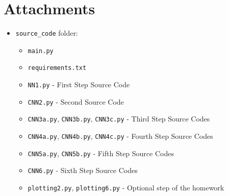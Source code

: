 \documentclass[a4paper, 11pt]{article}
\begin{document}
	\section*{Attachments}
	\begin{itemize}
		\item \texttt{source\_code} folder:
		\begin{itemize}
			\item \texttt{main.py}
			\item \texttt{requirements.txt}
			\item \texttt{NN1.py} - First Step Source Code
			\item \texttt{CNN2.py} - Second Source Code
			\item \texttt{CNN3a.py}, \texttt{CNN3b.py}, \texttt{CNN3c.py} - Third Step Source Codes
			\item \texttt{CNN4a.py}, \texttt{CNN4b.py}, \texttt{CNN4c.py} - Fourth Step Source Codes
			\item \texttt{CNN5a.py}, \texttt{CNN5b.py} - Fifth Step Source Codes
			\item \texttt{CNN6.py} - Sixth Step Source Codes
			\item \texttt{plotting2.py}, \texttt{plotting6.py} - Optional step of the homework
		\end{itemize}
	\end{itemize}

	
\end{document}
